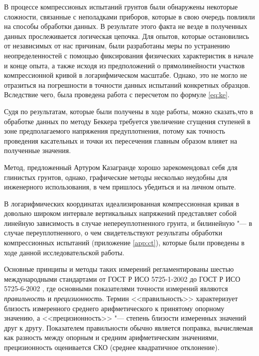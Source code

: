 В процессе компрессионых испытаний грунтов были обнаружены некоторые сложности, связанные с неполадками приборов, которые в свою очередь повлияли на способы обработки данных. В результате этого факта не везде в полученных данных прослеживается логическая цепочка. Для опытов, которые остановились от независимых от нас причинам, были разработаны меры по устранению неопределенностей с помощью фиксирования физических характеристик в начале и конце опыта, а также исходя из предположений о прямолинейности участков компрессионной кривой в логарифмическом масштабе. Однако, это не могло не отразиться на погрешности в точности данных испытаний конкретных образцов. 
Вследствие чего, была проведена работа с пересчетом по формуле \ref{eq:ke}.

Судя по результатам, которые были получены в ходе работы, можно сказать,что в обработке данных по методу Беккера требуется увеличение сгущения ступеней в зоне предполагаемого напряжения предуплотнения, потому как точность проведения касательных и точки их пересечения главным образом влияет на полученные значения.

Метод, предложенный Артуром Казагранде хорошо зарекомендовал себя для глинистых грунтов, однако, графические методы несколько неудобны для инженерного использования, в чем пришлось убедиться и на личном опыте.

В логарифмических координатах идеализированная компрессионная кривая в довольно широком интервале вертикальных напряжений представляет собой линейную зависимость в случае непереуплотненного грунта, и билинейную "--- в случае переуплотненного, о чем свидетельствуют результаты обработки компрессионных испытаний (приложение \ref{app:ct}), которые были проведены в ходе данной исследовательской работы. 
%
%

Основные принципы и методы таких измерений регламентированы шестью международными стандартами от ГОСТ Р ИСО 5725-1-2002 до ГОСТ Р ИСО 5725-6-2002 \cite{gost5725}, где основными показателями точности измерений являются \textit{правильность} и \textit{прецизионность}. Термин <<правильность>> характеризует близость измеренного среднего арифметического к принятому опорному значению, а <<прецизионность>> "--- степень близости измеренных значений друг к другу.
Показателем правильности обычно является поправка, вычисляемая как разность между опорным и средним арифметическим значениями, прецизионность оценивается СКО (среднее квадратичное отклонение). %


